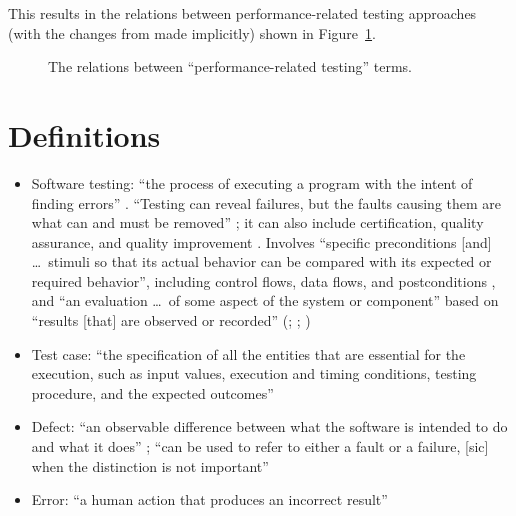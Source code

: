 This results in the relations between performance-related testing
approaches (with the changes from  made implicitly)
shown in Figure~\ref{fig:perf-graph}.

\begin{figure}[hbtp!]
      \centering
      \performanceGraph{}
      \caption{The relations between ``performance-related testing'' terms.}
      \label{fig:perf-graph}
\end{figure}

\section{Definitions}

\begin{itemize}
      \item Software testing: ``the process of executing a program with the
            intent of finding errors'' \citep[p.~438]{PetersAndPedrycz2000}
            . ``Testing can reveal
            failures, but the faults causing them are what can and must be
            removed'' \citep[p.~5-3]{SWEBOK2024}; it can also include
            certification, quality assurance, and quality improvement
            \citep[p.~5-4]{SWEBOK2024}. Involves ``specific preconditions
                  [and] \dots\ stimuli so that its actual behavior can be
            compared with its expected or required behavior'', including
            control flows, data flows, and postconditions
            \citep[p.~11]{Firesmith2015}, and ``an evaluation \dots\ of some
            aspect of the system or component'' based on ``results [that]
            are observed or recorded'' (\citealp[p.~10]{IEEE2022};
            \citeyear[p.~6]{IEEE2021}; \citeyear[p.~465]{IEEE2017}
            )
      \item Test case: ``the specification of all the entities
            that are essential for the execution, such as input values,
            execution and timing conditions, testing procedure, and the
            expected outcomes'' \citep[pp.~5-1 to 5-2]{SWEBOK2024}
      \item Defect: ``an observable difference between what the software is
            intended to do and what it does'' \citep[p.~1-1]{SWEBOK2024}; ``can
            be used to refer to either a fault or a failure, [sic] when the
            distinction is not important'' \citep[p.~4-3]{SWEBOK2014}
      \item Error: ``a human action that produces an incorrect result''

\end{itemize}
